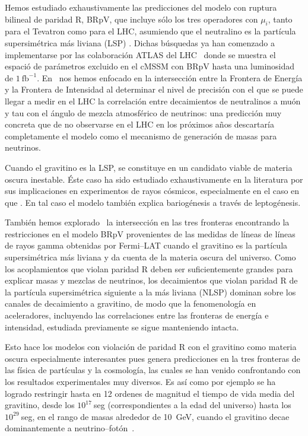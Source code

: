 Hemos estudiado exhaustivamente las predicciones del modelo con
ruptura bilineal de paridad R, BRpV, que incluye sólo los tres
operadores con $\mu_i$, tanto para el Tevatron como
para el LHC, asumiendo que el neutralino es la partícula
supersimétrica más liviana (LSP)
\cite{Magro:2003zb,deCampos:2005ri,deCampos:2007bn,deCampos:2008ic,deCampos:2008re,DeCampos:2010yu}. Dichas
búsquedas ya han comenzado a implementarse por las colaboración ATLAS
del LHC~\cite{:2011iu} donde se muestra el espació de parámetros
excluido en el cMSSM con BRpV hasta una luminosidad de $1\
\text{fb}^{-1}$.  En~\cite{DeCampos:2010yu} nos hemos enfocado en la
intersección entre la Frontera de Energía y la Frontera de Intensidad
al determinar el nivel de precisión con el que se puede llegar a medir
en el LHC la correlación entre decaimientos de neutralinos a muón y
tau con el ángulo de mezcla atmosférico de neutrinos: una predicción
muy concreta que de no observarse en el LHC en los próximos años
descartaría completamente el modelo como el mecanismo de generación de
masas para neutrinos. 

Cuando el gravitino es la LSP, se constituye en un candidato viable de
materia oscura inestable. Éste caso ha sido estudiado exhaustivamente
en la literatura por sus implicaciones en experimentos de rayos
cósmicos, especialmente en el caso en que . En tal caso el modelo
también explica bariogénesis a través de leptogénesis. 



También hemos explorado~\cite{} la intersección en
las tres fronteras encontrando la restricciones en el modelo BRpV
provenientes de las medidas de líneas de líneas de rayos gamma
obtenidas por Fermi--LAT cuando el gravitino es la partícula
supersimétrica más liviana y da cuenta de la materia oscura del
universo. Como los acoplamientos que violan paridad R deben ser
suficientemente grandes para explicar masas y mezclas de neutrinos,
los decaimientos que violan paridad R de la partícula supersimétrica
siguiente a la más liviana (NLSP) dominan sobre los canales de
decaimiento a gravitino, de modo que la fenomenología en aceleradores,
incluyendo las correlaciones entre las fronteras de energía e
intensidad, estudiada previamente se sigue manteniendo intacta.

Esto hace los modelos con violación de paridad R con el gravitino como
materia oscura especialmente interesantes pues genera predicciones en
la tres fronteras de las física de partículas y la cosmología, las
cuales se han venido confrontando con los resultados experimentales
muy diversos. Es así como por ejemplo se ha logrado restringir hasta
en 12 ordenes de magnitud el tiempo de vida media del gravitino, desde
los $10^{17}\ $seg (correspondientes a la edad del universo) hasta los
$10^{29}\ $seg, en el rango de masas alrededor de 10~GeV, cuando el
gravitino decae dominantemente a neutrino--fotón~\cite{}.  

